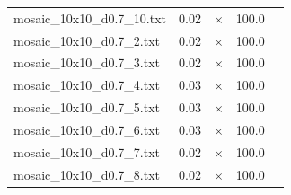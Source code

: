\documentclass{article}
\begin{document}
\begin{center}
\begin{tabular}{lrrrr}
mosaic\_10x10\_d0.7\_10.txt & 0.02 & 
$\times$
 & 100.0 & 
\\
mosaic\_10x10\_d0.7\_2.txt & 0.02 & 
$\times$
 & 100.0 & 
\\
mosaic\_10x10\_d0.7\_3.txt & 0.02 & 
$\times$
 & 100.0 & 
\\
mosaic\_10x10\_d0.7\_4.txt & 0.03 & 
$\times$
 & 100.0 & 
\\
mosaic\_10x10\_d0.7\_5.txt & 0.03 & 
$\times$
 & 100.0 & 
\\
mosaic\_10x10\_d0.7\_6.txt & 0.03 & 
$\times$
 & 100.0 & 
\\
mosaic\_10x10\_d0.7\_7.txt & 0.02 & 
$\times$
 & 100.0 & 
\\
mosaic\_10x10\_d0.7\_8.txt & 0.02 & 
$\times$
 & 100.0 & 
\\
\hline\end{tabular}
\end{center}
\end{document}
